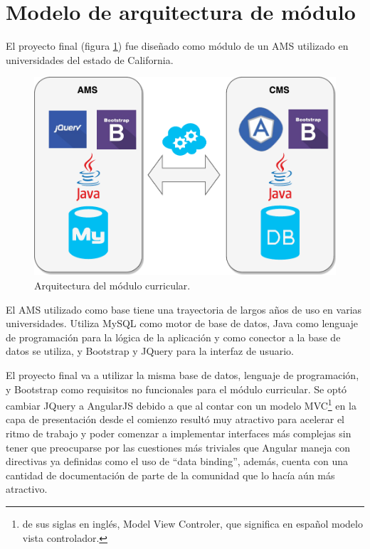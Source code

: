 \section{Modelo de arquitectura de módulo}

El proyecto final (figura \ref{arquitectura}) fue diseñado como módulo de un AMS utilizado en universidades del estado de California.

\begin{figure}[H]
\centering
\includegraphics[scale=0.6]{Capitulos/PropuestadeSolucion/Imagenes/arquitectura}
\caption{Arquitectura del módulo curricular.}
  \label{arquitectura}
\end{figure}

El AMS utilizado como base tiene una trayectoria de largos años de uso en varias universidades. Utiliza MySQL como motor de base de datos, Java como lenguaje de programación para la lógica de la aplicación y como conector a la base de datos se utiliza, y Bootstrap y JQuery para la interfaz de usuario. 

El proyecto final va a utilizar la misma base de datos, lenguaje de programación, y Bootstrap como requisitos no funcionales para el módulo curricular. Se optó cambiar JQuery a AngularJS debido a que al contar con un modelo MVC\footnote{de sus siglas en inglés, Model View Controler, que significa en español modelo vista controlador.} en la capa de presentación desde el comienzo resultó muy atractivo para acelerar el ritmo de trabajo y poder comenzar a implementar interfaces más complejas sin tener que preocuparse por las cuestiones más triviales que Angular maneja con directivas ya definidas como el uso de \enquote{data binding}, además, cuenta con una cantidad de documentación de parte de la comunidad que lo hacía aún más atractivo.